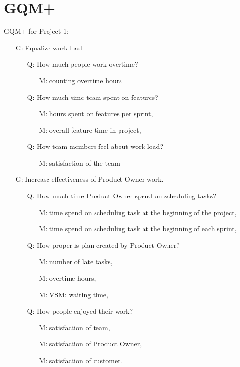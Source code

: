 \section{GQM+}

GQM+ for Project 1:

\begin{itemize}
\item[G:] Equalize work load
	\begin{itemize}
	\item[Q:] How much people work overtime?
    	\begin{itemize}
    	\item[M:] counting overtime hours
    	\end{itemize}
    \item[Q:] How much time team spent on features?
    	\begin{itemize}
    	\item[M:] hours spent on features per sprint,
        \item[M:] overall feature time in project,
    	\end{itemize}
    \item[Q:] How team members feel about work load?
    	\begin{itemize}
    	\item[M:] satisfaction of the team
    	\end{itemize}
	\end{itemize}
\item[G:] Increase effectiveness of Product Owner work.
	\begin{itemize}
	\item[Q:] How much time Product Owner spend on scheduling tasks?
    	\begin{itemize}
    	\item[M:] time spend on scheduling task at the beginning of the project,
        \item[M:] time spend on scheduling task at the beginning of each sprint,
    	\end{itemize}
    \item[Q:] How proper is plan created by Product Owner?
    	\begin{itemize}
    	\item[M:] number of late tasks,
        \item[M:] overtime hours,
        \item[M:] VSM: waiting time,
    	\end{itemize}
    \item[Q:] How people enjoyed their work?
    	\begin{itemize}
    	\item[M:] satisfaction of team,
        \item[M:] satisfaction of Product Owner,
        \item[M:] satisfaction of customer.
    	\end{itemize}
	\end{itemize}
\end{itemize}